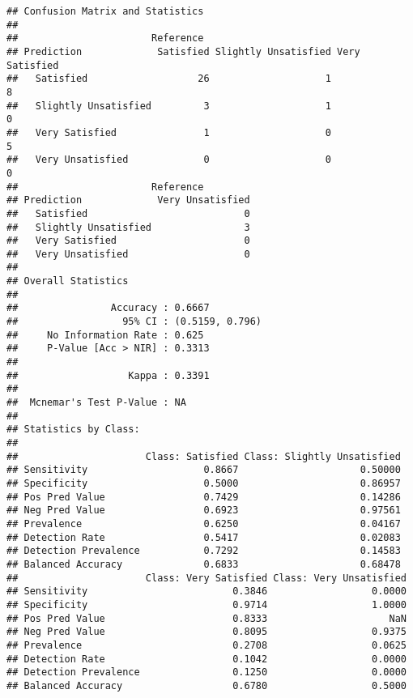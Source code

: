 \documentclass[
]{article}
\begin{document}
\begin{verbatim}
## Confusion Matrix and Statistics
## 
##                       Reference
## Prediction             Satisfied Slightly Unsatisfied Very Satisfied
##   Satisfied                   26                    1              8
##   Slightly Unsatisfied         3                    1              0
##   Very Satisfied               1                    0              5
##   Very Unsatisfied             0                    0              0
##                       Reference
## Prediction             Very Unsatisfied
##   Satisfied                           0
##   Slightly Unsatisfied                3
##   Very Satisfied                      0
##   Very Unsatisfied                    0
## 
## Overall Statistics
##                                          
##                Accuracy : 0.6667         
##                  95% CI : (0.5159, 0.796)
##     No Information Rate : 0.625          
##     P-Value [Acc > NIR] : 0.3313         
##                                          
##                   Kappa : 0.3391         
##                                          
##  Mcnemar's Test P-Value : NA             
## 
## Statistics by Class:
## 
##                      Class: Satisfied Class: Slightly Unsatisfied
## Sensitivity                    0.8667                     0.50000
## Specificity                    0.5000                     0.86957
## Pos Pred Value                 0.7429                     0.14286
## Neg Pred Value                 0.6923                     0.97561
## Prevalence                     0.6250                     0.04167
## Detection Rate                 0.5417                     0.02083
## Detection Prevalence           0.7292                     0.14583
## Balanced Accuracy              0.6833                     0.68478
##                      Class: Very Satisfied Class: Very Unsatisfied
## Sensitivity                         0.3846                  0.0000
## Specificity                         0.9714                  1.0000
## Pos Pred Value                      0.8333                     NaN
## Neg Pred Value                      0.8095                  0.9375
## Prevalence                          0.2708                  0.0625
## Detection Rate                      0.1042                  0.0000
## Detection Prevalence                0.1250                  0.0000
## Balanced Accuracy                   0.6780                  0.5000
\end{verbatim}
\end{document}
